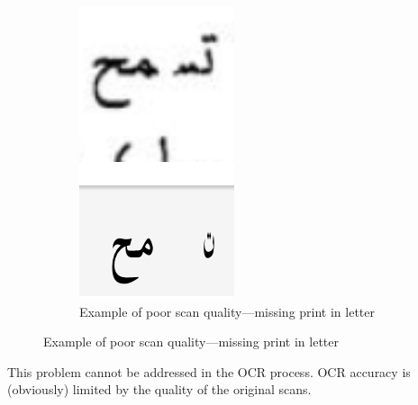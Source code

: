 \begin{figure}[!ht]
	\begin{subfigure}[b]{0.9\linewidth}
	\centering
	\includegraphics[width=\textwidth]{images/image15.png}
	\caption{Example of poor scan quality—missing print in letter}
	\label{fig3:fig28}
	\end{subfigure}
\end{figure} 

This problem cannot be addressed in the OCR process. OCR accuracy is
(obviously) limited by the quality of the original scans.

